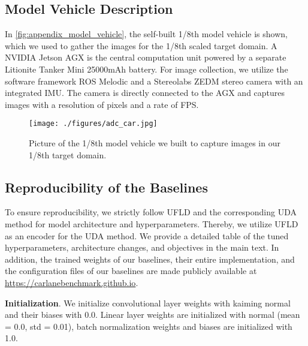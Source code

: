 \documentclass{article}
\begin{document}
\subsection{Model Vehicle Description}
In \autoref{fig:appendix_model_vehicle}, the self-built 1/8th model vehicle is shown, which we used to gather the images for the 1/8th scaled target domain. A NVIDIA Jetson AGX is the central computation unit powered by a separate Litionite Tanker Mini 25000mAh battery. For image collection, we utilize the software framework ROS Melodic and a Stereolabs ZEDM stereo camera with an integrated IMU. The camera is directly connected to the AGX and captures images with a resolution of  pixels and a rate of  FPS.

\begin{figure}[ht]
	\centering
	\texttt{[image: ./figures/adc\_car.jpg]}
	\caption{Picture of the 1/8th model vehicle we built to capture images in our 1/8th target domain.} 
	\label{fig:appendix_model_vehicle}
\end{figure}

\subsection{Reproducibility of the Baselines}
To ensure reproducibility, we strictly follow UFLD \cite{qin2020ultra} and the corresponding UDA method for model architecture and hyperparameters. Thereby, we utilize UFLD as an encoder for the UDA method. We provide a detailed table of the tuned hyperparameters, architecture changes, and objectives in the main text. In addition, the trained weights of our baselines, their entire implementation, and the configuration files of our baselines are made publicly available at \href{https://carlanebenchmark.github.io}{https://carlanebenchmark.github.io}. 

\textbf{Initialization}. We initialize convolutional layer weights with kaiming normal and their biases with 0.0. Linear layer weights are initialized with normal (mean = 0.0, std = 0.01), batch normalization weights and biases are initialized with 1.0.
\end{document}

